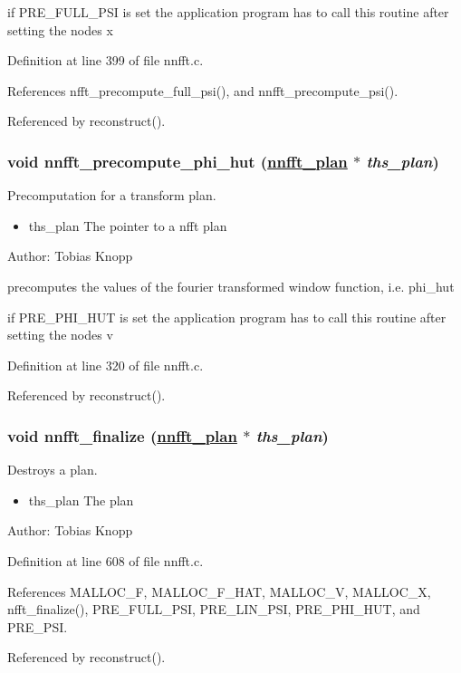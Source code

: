 if PRE\_\-FULL\_\-PSI is set the application program has to call this routine after setting the nodes x 

Definition at line 399 of file nnfft.c.

References nfft\_\-precompute\_\-full\_\-psi(), and nnfft\_\-precompute\_\-psi().

Referenced by reconstruct().\hypertarget{group__nnfft_ga9}{
\subsubsection[nnfft\_\-precompute\_\-phi\_\-hut]{\setlength{\rightskip}{0pt plus 5cm}void nnfft\_\-precompute\_\-phi\_\-hut (\hyperlink{structnnfft__plan}{nnfft\_\-plan} $\ast$ {\em ths\_\-plan})}}
\label{group__nnfft_ga9}


Precomputation for a transform plan. 

\begin{itemize}
\item ths\_\-plan The pointer to a nfft plan\end{itemize}
\begin{Desc}
\item[Author:]Tobias Knopp\end{Desc}
precomputes the values of the fourier transformed window function, i.e. phi\_\-hut

if PRE\_\-PHI\_\-HUT is set the application program has to call this routine after setting the nodes v 

Definition at line 320 of file nnfft.c.

Referenced by reconstruct().\hypertarget{group__nnfft_ga10}{
\subsubsection[nnfft\_\-finalize]{\setlength{\rightskip}{0pt plus 5cm}void nnfft\_\-finalize (\hyperlink{structnnfft__plan}{nnfft\_\-plan} $\ast$ {\em ths\_\-plan})}}
\label{group__nnfft_ga10}


Destroys a plan. 

\begin{itemize}
\item ths\_\-plan The plan\end{itemize}
\begin{Desc}
\item[Author:]Tobias Knopp \end{Desc}


Definition at line 608 of file nnfft.c.

References MALLOC\_\-F, MALLOC\_\-F\_\-HAT, MALLOC\_\-V, MALLOC\_\-X, nfft\_\-finalize(), PRE\_\-FULL\_\-PSI, PRE\_\-LIN\_\-PSI, PRE\_\-PHI\_\-HUT, and PRE\_\-PSI.

Referenced by reconstruct().